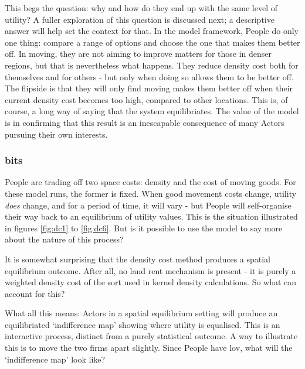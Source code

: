 This begs the question: why and how do they end up with the same level of utility? A fuller exploration of this question is discussed next; a descriptive answer will help set the context for that. In the model framework, People do only one thing: compare a range of options and choose the one that makes them better off. In moving, they are not aiming to improve matters for those in denser regions, but that is nevertheless what happens. They reduce density cost both for themselves and for others - but only when doing so allows them to be better off. The flipside is that they will only find moving makes them better off when their current density cost becomes too high, compared to other locations. This is, of course, a long way of saying that the system equilibriates. The value of the model is in confirming that this result is an inescapable consequence of many Actors pursuing their own interests.

\subsubsection{bits}

People are trading off two space costs: density and the cost of moving goods. For these model runs, the former is fixed. When good movement costs change, utility \emph{does} change, and for a period of time, it will vary - but People will self-organise their way back to an equilibrium of utility values. This is the situation illustrated in figures \ref{fig:dc1} to \ref{fig:dc6}. But is it possible to use the model to say more about the nature of this process? 

It is somewhat surprising that the density cost method produces a spatial equilibrium outcome. After all, no land rent mechanism is present - it is purely a weighted density cost of the sort used in kernel density calculations. So what can account for this? 

What all this means: Actors in a spatial equilibrium setting will produce an equilibriated `indifference map' showing where utility is equalised. This is an interactive process, distinct from a purely statistical outcome. A way to illustrate this is to move the two firms apart slightly. Since People have \gls{lov}, what will the `indifference map' look like?

